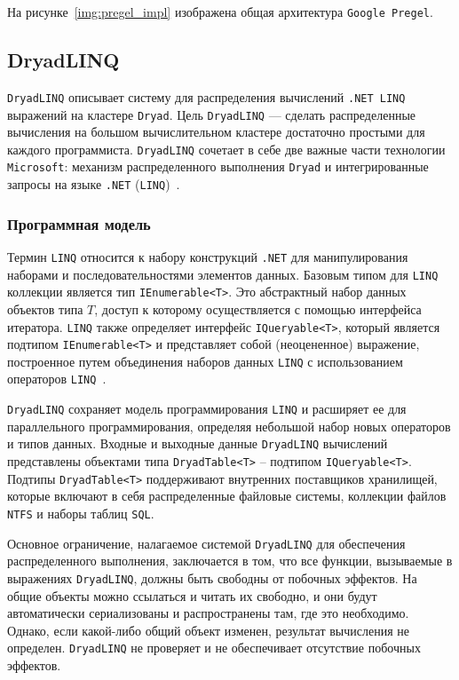 На рисунке~\ref{img:pregel_impl} изображена общая архитектура \texttt{Google Pregel}.


\subsection{DryadLINQ}

\texttt{DryadLINQ} описывает систему для распределения вычислений \texttt{.NET LINQ} выражений на кластере \texttt{Dryad}.
Цель \texttt{DryadLINQ} --- сделать распределенные вычисления на большом вычислительном кластере достаточно простыми для каждого программиста. 
\texttt{DryadLINQ} сочетает в себе две важные части технологии \texttt{Microsoft}: механизм распределенного выполнения \texttt{Dryad} и интегрированные запросы на языке \texttt{.NET} (\texttt{LINQ})~\cite{microsoft-dryad}.

\subsubsection{Программная модель}

Термин \texttt{LINQ} относится к набору конструкций \texttt{.NET} для манипулирования наборами и последовательностями элементов данных.
Базовым типом для \texttt{LINQ} коллекции является тип \texttt{IEnumerable<T>}. 
Это абстрактный набор данных объектов типа $T$, доступ к которому осуществляется с помощью интерфейса итератора. 
\texttt{LINQ} также определяет интерфейс \texttt{IQueryable<T>}, который является подтипом \texttt{IEnumerable<T>} и представляет собой (неоцененное) выражение, построенное путем объединения наборов данных \texttt{LINQ} с использованием операторов \texttt{LINQ}~\cite{267963}.

\texttt{DryadLINQ} сохраняет модель программирования \texttt{LINQ} и расширяет ее для параллельного программирования, определяя небольшой набор новых операторов и типов данных.
Входные и выходные данные \texttt{DryadLINQ} вычислений представлены объектами типа \texttt{DryadTable<T>} -- подтипом \texttt{IQueryable<T>}. 
Подтипы \texttt{DryadTable<T>} поддерживают внутренних поставщиков хранилищей, которые включают в себя распределенные файловые системы, коллекции файлов \texttt{NTFS} и наборы таблиц \texttt{SQL}.

Основное ограничение, налагаемое системой \texttt{DryadLINQ} для обеспечения распределенного выполнения, заключается в том, что все функции, вызываемые в выражениях \texttt{DryadLINQ}, должны быть свободны от побочных эффектов. 
На общие объекты можно ссылаться и читать их свободно, и они будут автоматически сериализованы и распространены там, где это необходимо. 
Однако, если какой-либо общий объект изменен, результат вычисления не определен. 
\texttt{DryadLINQ} не проверяет и не обеспечивает отсутствие побочных эффектов.

